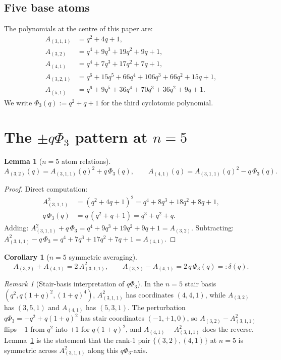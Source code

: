 \documentclass[11pt]{article}
\theoremstyle{plain}
\newtheorem{lemma}[theorem]{Lemma}
\newtheorem{corollary}[theorem]{Corollary}
\theoremstyle{definition}
\theoremstyle{remark}
\newtheorem{remark}[theorem]{Remark}
\newcommand{\PhiThree}{\Phi_3}
\begin{document}
\subsection{Five base atoms}

The polynomials at the centre of this paper are:
\begin{align*}
A_{(3,1,1)}  &= q^2 + 4q + 1, \\
A_{(3,2)}    &= q^4 + 9q^3 + 19q^2 + 9q + 1, \\
A_{(4,1)}    &= q^4 + 7q^3 + 17q^2 + 7q + 1, \\
A_{(3,2,1)}  &= q^6 + 15q^5 + 66q^4 + 106q^3 + 66q^2 + 15q + 1, \\
A_{(5,1)}    &= q^6 + 9q^5  + 36q^4 + 70q^3  + 36q^2 + 9q  + 1.
\end{align*}
We write $\PhiThree(q) := q^2 + q + 1$ for the third cyclotomic polynomial.

\section{The $\pm q\PhiThree$ pattern at $n = 5$}

\begin{lemma}[$n=5$ atom relations]\label{lem:n5}
\[
A_{(3,2)}(q)  = A_{(3,1,1)}(q)^2 + q\,\PhiThree(q), \qquad
A_{(4,1)}(q)  = A_{(3,1,1)}(q)^2 - q\,\PhiThree(q).
\]
\end{lemma}

\begin{proof}
Direct computation:
\begin{align*}
A_{(3,1,1)}^2 &= (q^2+4q+1)^2 = q^4 + 8q^3 + 18q^2 + 8q + 1, \\
q\,\PhiThree(q) &= q\,(q^2+q+1) = q^3 + q^2 + q.
\end{align*}
Adding: $A_{(3,1,1)}^2 + q\,\PhiThree = q^4 + 9q^3 + 19q^2 + 9q + 1 = A_{(3,2)}$.
Subtracting: $A_{(3,1,1)}^2 - q\,\PhiThree = q^4 + 7q^3 + 17q^2 + 7q + 1 =
A_{(4,1)}$.\qedhere
\end{proof}

\begin{corollary}[$n = 5$ symmetric averaging]\label{cor:n5sum}
\[
A_{(3,2)} + A_{(4,1)} = 2\,A_{(3,1,1)}^2,
\qquad
A_{(3,2)} - A_{(4,1)} = 2\,q\,\PhiThree(q) =: \delta(q).
\]
\end{corollary}

\begin{remark}[Stair-basis interpretation of $q\PhiThree$]
\label{rem:stairperturb}
In the $n=5$ stair basis $(q^2, q(1+q)^2, (1+q)^4)$, $A_{(3,1,1)}^2$ has
coordinates $(4,4,1)$, while $A_{(3,2)}$ has $(3,5,1)$ and $A_{(4,1)}$ has
$(5,3,1)$.  The perturbation $q\PhiThree = -q^2 + q(1+q)^2$ has stair
coordinates $(-1, +1, 0)$, so $A_{(3,2)} - A_{(3,1,1)}^2$ flips $-1$ from $q^2$
into $+1$ for $q(1+q)^2$, and $A_{(4,1)} - A_{(3,1,1)}^2$ does the reverse.
Lemma~\ref{lem:n5} is the statement that the rank-$1$ pair
$\{(3,2), (4,1)\}$ at $n = 5$ is symmetric across $A_{(3,1,1)}^2$ along this
$q\PhiThree$-axis.
\end{remark}
\end{document}
